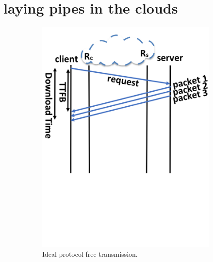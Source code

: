 \section{laying pipes in the clouds}\label{sec:rate-control}

\begin{figure}[!t]
  \centering
    \begin{subfigure}{0.65\columnwidth}
  \centering
  \includegraphics[width=\columnwidth]{figures/ideal.png}
    \caption{Ideal protocol-free transmission.}
    \label{fig:ideal}
\end{subfigure}    \centering
\begin{subfigure}{0.65\columnwidth}
  \centering

\end{subfigure}
\end{figure}
